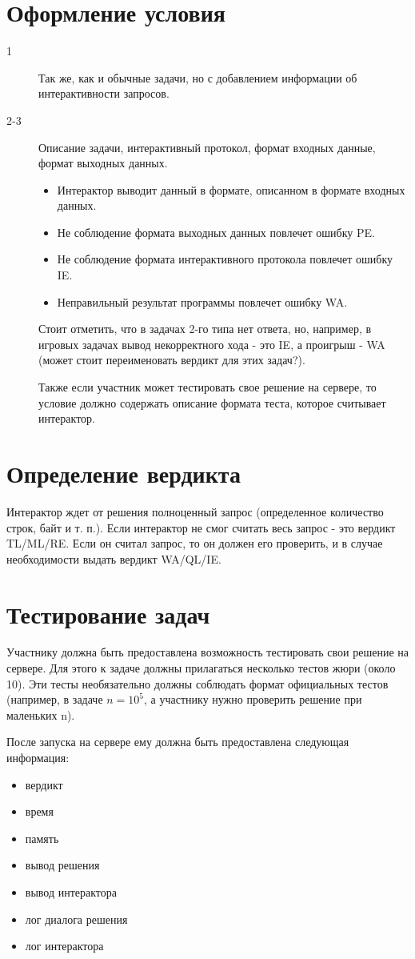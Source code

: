\section{Оформление условия}
\begin{description}
    \item[1] Так же, как и обычные задачи, но с добавлением информации об интерактивности запросов.
    \item[2-3] Описание задачи, интерактивный протокол, формат входных данные, формат выходных данных.
        \begin{itemize}
            \item Интерактор выводит данный в формате, описанном в формате входных данных.
            \item Не соблюдение формата выходных данных повлечет ошибку PE.
            \item Не соблюдение формата интерактивного протокола повлечет ошибку IE.
            \item Неправильный результат программы повлечет ошибку WA.
        \end{itemize}

       Стоит отметить, что в задачах 2-го типа нет ответа, но, например, в игровых задачах вывод некорректного хода - это IE, а проигрыш - WA (может стоит переименовать вердикт для этих задач?).

       Также если участник может тестировать свое решение на сервере, то условие должно содержать описание формата теста, которое считывает интерактор.
\end{description}

\section{Определение вердикта}
Интерактор ждет от решения полноценный запрос (определенное количество строк, байт и т. п.). Если интерактор не смог считать весь запрос - это вердикт TL/ML/RE. Если он считал запрос, то он должен его проверить, и в случае необходимости выдать вердикт WA/QL/IE.

\section{Тестирование задач}
Участнику должна быть предоставлена возможность тестировать свои решение на сервере.
Для этого к задаче должны прилагаться несколько тестов жюри (около 10).
Эти тесты необязательно должны соблюдать формат официальных тестов
(например, в задаче $n = 10^5$, а участнику нужно проверить решение при маленьких n).

После запуска на сервере ему должна быть предоставлена следующая информация:
\begin{itemize}
    \item вердикт
    \item время
    \item память
    \item вывод решения
    \item вывод интерактора
    \item лог диалога решения
    \item лог интерактора
\end{itemize}


